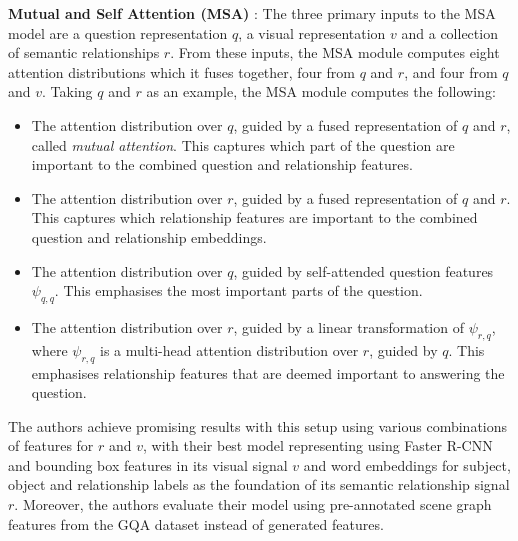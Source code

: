 \textbf{Mutual and Self Attention (MSA)} \cite{farazi2020attention}: The three primary inputs to the MSA model are a question representation \(q\), a visual representation \(v\) and a collection of semantic relationships \(r\). From these inputs, the MSA module computes eight attention distributions which it fuses together, four from \(q\) and \(r\), and four from \(q\) and \(v\). Taking \(q\) and \(r\) as an example, the MSA module computes the following:

\begin{itemize}
    \item The attention distribution over \(q\), guided by a fused representation of \(q\) and \(r\), called \textit{mutual attention}. This captures which part of the question are important to the combined question and relationship features.
    \item The attention distribution over \(r\), guided by a fused representation of \(q\) and \(r\). This captures which relationship features are important to the combined question and relationship embeddings.
    \item The attention distribution over \(q\), guided by self-attended question features \(\psi_{q, q}\). This emphasises the most important parts of the question.
    \item The attention distribution over \(r\), guided by a linear transformation of \(\psi_{r, q}\), where \(\psi_{r, q}\) is a multi-head attention distribution over \(r\), guided by \(q\). This emphasises relationship features that are deemed important to answering the question.
\end{itemize}

The authors achieve promising results with this setup using various combinations of features for \(r\) and \(v\), with their best model representing using Faster R-CNN and bounding box features in its visual signal \(v\) and word embeddings for subject,
object and relationship labels as the foundation of its semantic relationship signal \(r\). Moreover, the authors evaluate their model using pre-annotated scene graph features from the GQA dataset instead of generated features.

